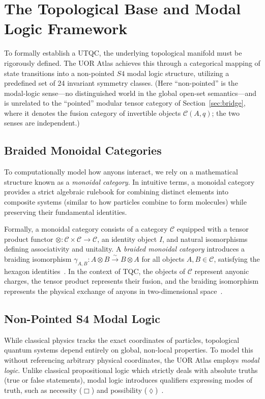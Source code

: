 \section{The Topological Base and Modal Logic Framework}

To formally establish a UTQC, the underlying topological manifold must be rigorously defined. The UOR Atlas achieves this through a categorical mapping of state transitions into a non-pointed $S4$ modal logic structure, utilizing a predefined set of 24 invariant symmetry classes. (Here ``non-pointed'' is the modal-logic sense---no distinguished world in the global open-set semantics---and is unrelated to the ``pointed'' modular tensor category of Section~\ref{sec:bridge}, where it denotes the fusion category of invertible objects $\mathcal{C}(A,q)$; the two senses are independent.)

\subsection{Braided Monoidal Categories}
To computationally model how anyons interact, we rely on a mathematical structure known as a \textit{monoidal category}. In intuitive terms, a monoidal category provides a strict algebraic rulebook for combining distinct elements into composite systems (similar to how particles combine to form molecules) while preserving their fundamental identities.

Formally, a monoidal category consists of a category $\mathcal{C}$ equipped with a tensor product functor $\otimes: \mathcal{C} \times \mathcal{C} \rightarrow \mathcal{C}$, an identity object $I$, and natural isomorphisms defining associativity and unitality. A \textit{braided monoidal category} introduces a braiding isomorphism $\gamma_{A,B}: A \otimes B \xrightarrow{\sim} B \otimes A$ for all objects $A, B \in \mathcal{C}$, satisfying the hexagon identities~\cite{joyal1993}. In the context of TQC, the objects of $\mathcal{C}$ represent anyonic charges, the tensor product represents their fusion, and the braiding isomorphism represents the physical exchange of anyons in two-dimensional space~\cite{wang2010}.

\subsection{Non-Pointed S4 Modal Logic}
While classical physics tracks the exact coordinates of particles, topological quantum systems depend entirely on global, non-local properties. To model this without referencing arbitrary physical coordinates, the UOR Atlas employs \textit{modal logic}. Unlike classical propositional logic which strictly deals with absolute truths (true or false statements), modal logic introduces qualifiers expressing modes of truth, such as necessity ($\Box$) and possibility ($\lozenge$)~\cite{blackburn2001}.

